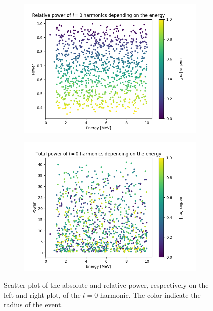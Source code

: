 \documentclass[../main.tex]{subfiles}
\begin{document}
\begin{figure}[ht]
  \centering
  \begin{subfigure}[t]{0.48\linewidth}
    \includegraphics[width=\linewidth]{images/jgnn/harmonic/power_energy_dependency.png}
  \end{subfigure}
  \hfill
  \begin{subfigure}[t]{0.48\linewidth}
    \includegraphics[width=\linewidth]{images/jgnn/harmonic/rel_power_energy_dependency.png}
  \end{subfigure}
  \caption{Scatter plot of the absolute and relative power, respectively on the left and right plot, of the $l=0$ harmonic. The color indicate the radius of the event.}
  \label{fig:annex:jgnn:harmonic:energy_dependent}
\end{figure}
\end{document}
